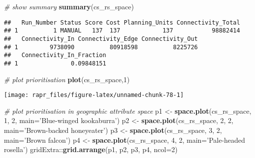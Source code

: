 \documentclass[11pt,]{article}
\newenvironment{Shaded}{\begin{snugshade}}{\end{snugshade}}
\newcommand{\KeywordTok}[1]{\textcolor[rgb]{0.13,0.29,0.53}{\textbf{{#1}}}}
\newcommand{\DataTypeTok}[1]{\textcolor[rgb]{0.13,0.29,0.53}{{#1}}}
\newcommand{\DecValTok}[1]{\textcolor[rgb]{0.00,0.00,0.81}{{#1}}}
\newcommand{\StringTok}[1]{\textcolor[rgb]{0.31,0.60,0.02}{{#1}}}
\newcommand{\CommentTok}[1]{\textcolor[rgb]{0.56,0.35,0.01}{\textit{{#1}}}}
\newcommand{\NormalTok}[1]{{#1}}
\begin{document}
\begin{Shaded}
\begin{Highlighting}[]
\CommentTok{# show summary}
\KeywordTok{summary}\NormalTok{(cs_rs_space)}
\end{Highlighting}
\end{Shaded}

\begin{verbatim}
##   Run_Number Status Score Cost Planning_Units Connectivity_Total
## 1          1 MANUAL   137  137            137           98882414
##   Connectivity_In Connectivity_Edge Connectivity_Out
## 1         9738090          80918598          8225726
##   Connectivity_In_Fraction
## 1               0.09848151
\end{verbatim}

\begin{Shaded}
\begin{Highlighting}[]
\CommentTok{# plot prioritisation}
\KeywordTok{plot}\NormalTok{(cs_rs_space,}\DecValTok{1}\NormalTok{)}
\end{Highlighting}
\end{Shaded}

\begin{center}\texttt{[image: rapr\_files/figure-latex/unnamed-chunk-78-1]} \end{center}

\begin{Shaded}
\begin{Highlighting}[]
\CommentTok{# plot prioritisation in geographic attribute space}
\NormalTok{p1 <-}\StringTok{ }\KeywordTok{space.plot}\NormalTok{(cs_rs_space, }\DecValTok{1}\NormalTok{, }\DecValTok{2}\NormalTok{, }\DataTypeTok{main=}\StringTok{'Blue-winged kookaburra'}\NormalTok{)}
\NormalTok{p2 <-}\StringTok{ }\KeywordTok{space.plot}\NormalTok{(cs_rs_space, }\DecValTok{2}\NormalTok{, }\DecValTok{2}\NormalTok{, }\DataTypeTok{main=}\StringTok{'Brown-backed honeyeater'}\NormalTok{)}
\NormalTok{p3 <-}\StringTok{ }\KeywordTok{space.plot}\NormalTok{(cs_rs_space, }\DecValTok{3}\NormalTok{, }\DecValTok{2}\NormalTok{, }\DataTypeTok{main=}\StringTok{'Brown falcon'}\NormalTok{)}
\NormalTok{p4 <-}\StringTok{ }\KeywordTok{space.plot}\NormalTok{(cs_rs_space, }\DecValTok{4}\NormalTok{, }\DecValTok{2}\NormalTok{, }\DataTypeTok{main=}\StringTok{'Pale-headed rosella'}\NormalTok{)}
\NormalTok{gridExtra::}\KeywordTok{grid.arrange}\NormalTok{(p1, p2, p3, p4, }\DataTypeTok{ncol=}\DecValTok{2}\NormalTok{)}
\end{Highlighting}
\end{Shaded}
\end{document}
